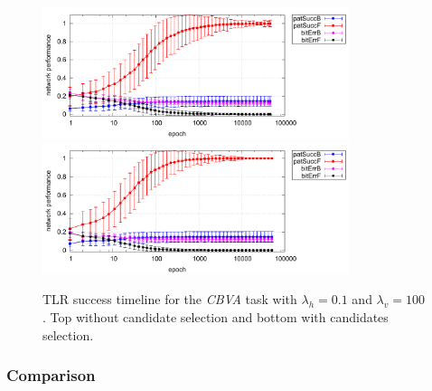 \begin{figure}[H]
  \centering
  \includegraphics[width=0.8\textwidth]{img/tlr-k3-3-best-perf.pdf}   
  \includegraphics[width=0.8\textwidth]{img/tlr-k3-3-best-can.pdf}      
  \caption{TLR success timeline for the \emph{CBVA} task with $\lambda_h=0.1$ and $\lambda_v=100$. Top without candidate selection and bottom with candidates selection. }
  \label{fig:results-tlr-k3-epoch} 
\end{figure}

\subsubsection{Comparison} 
\label{sec:results-cmp-k3} 


